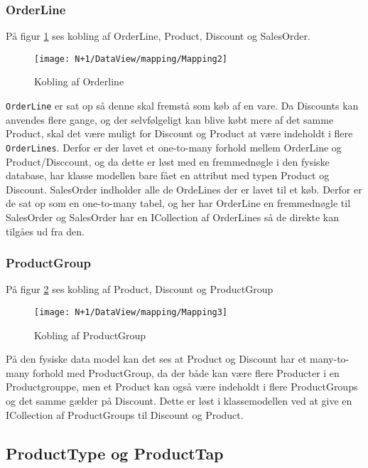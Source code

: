 \subsubsection{OrderLine}
På figur \ref{fig:Mapping_Orderline} ses kobling af OrderLine, Product, Discount og SalesOrder. 

\begin{figure}[H]
    \centering
    \texttt{[image: N+1/DataView/mapping/Mapping2]}
    \caption{Kobling af Orderline}
    \label{fig:Mapping_Orderline}
\end{figure}

\texttt{OrderLine} er sat op så denne skal fremstå som køb af en vare. Da Discounts kan anvendes flere gange, og der selvfølgeligt kan blive købt mere af det samme Product, skal det være muligt for Discount og Product at være indeholdt i flere \texttt{OrderLines}. Derfor er der lavet et one-to-many forhold mellem OrderLine og Product/Disccount, og da dette er løst med en fremmednøgle i den fysiske database, har klasse modellen bare fået en attribut med typen Product og Discount. 
\newline\newline
SalesOrder indholder alle de OrdeLines der er lavet til et køb. Derfor er de sat op som en one-to-many tabel, og her har OrderLine en fremmednøgle til SalesOrder og SalesOrder har en ICollection af OrderLines så de direkte kan tilgåes ud fra den. 

\subsubsection{ProductGroup}
På figur \ref{fig:Mapping_ProductGroup} ses kobling af Product, Discount og ProductGroup
\begin{figure}[H]
    \centering
    \texttt{[image: N+1/DataView/mapping/Mapping3]}
    \caption{Kobling af ProductGroup}
    \label{fig:Mapping_ProductGroup}
\end{figure}

På den fysiske data model kan det ses at Product og Discount har et many-to-many forhold med ProductGroup, da der både kan være flere Producter i en Productgrouppe, men et Product kan også være indeholdt i flere ProductGroups og det samme gælder på Discount. Dette er løst i klassemodellen ved at give en ICollection af ProductGroups til Discount og Product. 

\subsection{ProductType og ProductTap}


